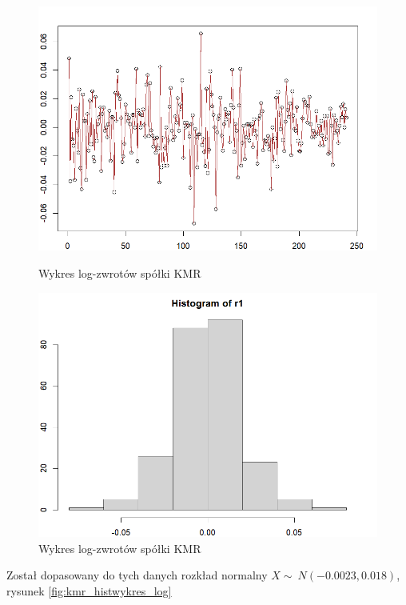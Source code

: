 \documentclass[a4paper,11pt]{article}
\begin{document}
\begin{figure}[!htb]
    \begin{minipage}{.45\textwidth}
        \centering
        \includegraphics[width=\linewidth]{kmr_wykres_log.png}
        \caption{Wykres log-zwrotów spółki KMR}
        \label{fig:kmr_wykres_log}
    \end{minipage}\hspace{0.1\textwidth}%
    \begin{minipage}{.45\textwidth}
        \centering
        \includegraphics[width=\linewidth]{kmr_hist_log.png}
        \caption{Wykres log-zwrotów spółki KMR}
        \label{fig:kmr_hist_log}
    \end{minipage}
\end{figure}

Został dopasowany do tych danych rozkład normalny $X \sim\ N(-0.0023, 0.018)$, rysunek \ref{fig:kmr_histwykres_log}
\end{document}
